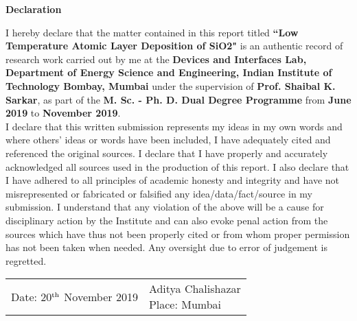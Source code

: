 \begin{center}
{\LARGE \textbf{ Declaration}}
\end{center}
I hereby declare that the matter contained in this report titled  \textbf{``Low Temperature Atomic Layer Deposition of {SiO2}"} is an authentic record of research work carried out by me at the \textbf{Devices and Interfaces Lab, Department of Energy Science and Engineering, Indian Institute of Technology Bombay, Mumbai} under the supervision of \textbf{ Prof. Shaibal K. Sarkar}, as part of the \textbf{M. Sc. - Ph. D. Dual Degree Programme} from \textbf{June 2019} to \textbf{November 2019}.\bigskip\\
I declare that this written submission represents my ideas in my own words and where others' ideas or words have been included, I have adequately cited and referenced the original sources. I declare that I have properly and accurately acknowledged all sources used in the production of this report. I also declare that I have adhered to all principles of academic honesty and integrity and have not misrepresented or fabricated or falsified any idea/data/fact/source in my submission. I understand that any violation of the above will be a cause for disciplinary action by the Institute and can also evoke penal action from the sources which have thus not been properly cited or from whom proper permission has not been taken when needed. Any oversight due to error of judgement is regretted.
\vspace{3 cm}

\begin{tabular}{p{80mm}  p{80mm}}
     Date: 20$^{\rm th}$ November 2019 &\makecell[r]{Aditya Chalishazar\\ Place: Mumbai} 
\end{tabular}
